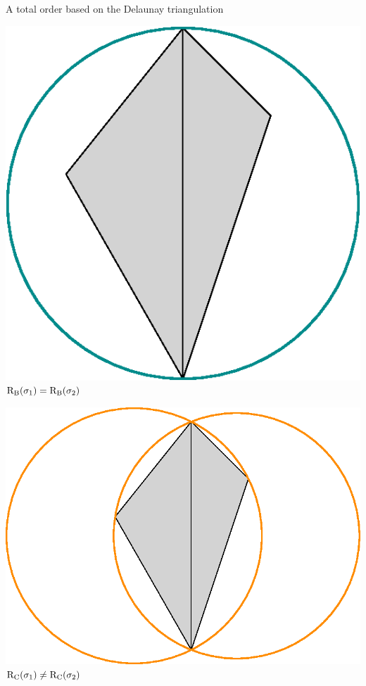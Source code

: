 \begin{frame}[c]{A total order based on the Delaunay triangulation}
	\scriptsize
	\begin{center}
		\begin{minipage}{0.5\linewidth}
			\centering
			\includegraphics[height=0.3\textheight]{order_rseb}\\
			\color{pathblue}$\operatorname{R_B}(\sigma_1) = \operatorname{R_B}(\sigma_2)$	
		\end{minipage}%
		\begin{minipage}{0.5\linewidth}
			\centering
			\includegraphics[height=0.3\textheight]{order_rcirc}\\
			\color{pathorange} $\operatorname{R_C}(\sigma_1) \neq \operatorname{R_C}(\sigma_2)$
		\end{minipage}%
	\end{center}
	

\end{frame}
